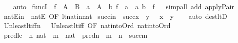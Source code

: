 \begin{isabellebody}
%
\isadelimproof
\ \ %
\endisadelimproof
%
\isatagproof
{}\isamarkupfalse%
\ {\isacharparenleft}{\kern0pt}auto{\isacharparenright}{\kern0pt}%
\endisatagproof
{\isafoldproof}%
%
\isadelimproof
\isanewline
%
\endisadelimproof
\isanewline
\isanewline
{}\isamarkupfalse%
\ funcI\ {\isacharcolon}{\kern0pt}\ {\isachardoublequoteopen}f\ {\isasymin}\ A\ {\isasymrightarrow}\ B\ {\isasymLongrightarrow}\ a\ {\isasymin}\ A\ {\isasymLongrightarrow}\ b{\isacharequal}{\kern0pt}\ f\ {\isacharbackquote}{\kern0pt}\ a\ {\isasymLongrightarrow}\ {\isasymlangle}a{\isacharcomma}{\kern0pt}\ b{\isasymrangle}\ {\isasymin}\ f{\isachardoublequoteclose}\isanewline
%
\isadelimproof
\ \ %
\endisadelimproof
%
\isatagproof
{}\isamarkupfalse%
{\isacharparenleft}{\kern0pt}simp{\isacharunderscore}{\kern0pt}all\ add{\isacharcolon}{\kern0pt}\ apply{\isacharunderscore}{\kern0pt}Pair{\isacharparenright}{\kern0pt}%
\endisatagproof
{\isafoldproof}%
%
\isadelimproof
\isanewline
%
\endisadelimproof
\isanewline
{}\isamarkupfalse%
\ natEin\ {\isacharequal}{\kern0pt}\ natE\ {\isacharbrackleft}{\kern0pt}OF\ lt{\isacharunderscore}{\kern0pt}nat{\isacharunderscore}{\kern0pt}in{\isacharunderscore}{\kern0pt}nat{\isacharbrackright}{\kern0pt}\isanewline
\isanewline
{}\isamarkupfalse%
\ succ{\isacharunderscore}{\kern0pt}in\ {\isacharcolon}{\kern0pt}\ {\isachardoublequoteopen}succ{\isacharparenleft}{\kern0pt}x{\isacharparenright}{\kern0pt}\ {\isasymle}\ y\ \ {\isasymLongrightarrow}\ x\ {\isasymin}\ y{\isachardoublequoteclose}\isanewline
%
\isadelimproof
\ \ %
\endisadelimproof
%
\isatagproof
{}\isamarkupfalse%
\ {\isacharparenleft}{\kern0pt}auto\ dest{\isacharcolon}{\kern0pt}ltD{\isacharparenright}{\kern0pt}%
\endisatagproof
{\isafoldproof}%
%
\isadelimproof
\isanewline
%
\endisadelimproof
\isanewline
{}\isamarkupfalse%
\ Un{\isacharunderscore}{\kern0pt}least{\isacharunderscore}{\kern0pt}lt{\isacharunderscore}{\kern0pt}iffn\ {\isacharequal}{\kern0pt}\ \ Un{\isacharunderscore}{\kern0pt}least{\isacharunderscore}{\kern0pt}lt{\isacharunderscore}{\kern0pt}iff\ {\isacharbrackleft}{\kern0pt}OF\ nat{\isacharunderscore}{\kern0pt}into{\isacharunderscore}{\kern0pt}Ord\ nat{\isacharunderscore}{\kern0pt}into{\isacharunderscore}{\kern0pt}Ord{\isacharbrackright}{\kern0pt}\isanewline
\isanewline
{}\isamarkupfalse%
\ pred{\isacharunderscore}{\kern0pt}le{}\ {\isacharcolon}{\kern0pt}\ {\isachardoublequoteopen}n{\isasymin}\ nat\ {\isasymLongrightarrow}\ m\ {\isasymin}\ nat\ {\isasymLongrightarrow}\ pred{\isacharparenleft}{\kern0pt}n{\isacharparenright}{\kern0pt}\ {\isasymle}\ m\ {\isasymLongrightarrow}\ n\ {\isasymle}\ succ{\isacharparenleft}{\kern0pt}m{\isacharparenright}{\kern0pt}{\isachardoublequoteclose}\isanewline

\end{isabellebody}
